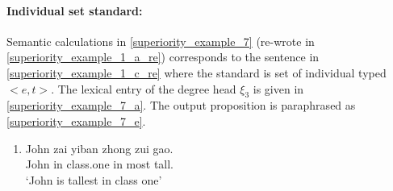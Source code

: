 \documentclass{ctexart}
\begin{document}
\paragraph{Individual set standard:}

Semantic calculations in \ref{superiority_example_7} (re-wrote in \ref{superiority_example_1_a_re}) corresponds to the sentence in \ref{superiority_example_1_c_re} where the standard is set of individual typed $<e,t>$. The lexical entry of the degree head $\xi_3$ is given in \ref{superiority_example_7_a}. The output proposition is paraphrased as \ref{superiority_example_7_e}.

\begin{enumerate}
    \item \label{superiority_example_1_c_re}
    John zai yiban zhong zui gao. \\
    John in class.one in most tall. \\
    `John is tallest in class one' 
\end{enumerate}
\end{document}
